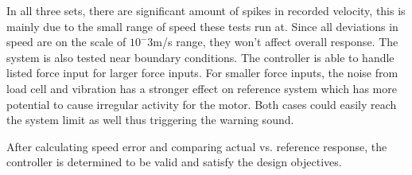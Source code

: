 In all three sets, there are significant amount of spikes in recorded velocity, this is mainly due to the small range of speed these tests run at. Since all deviations in speed are on the scale of $10^-3$m/s range, they won't affect overall response. The system is also tested near boundary conditions. The controller is able to handle listed force input for larger force inputs. For smaller force inputs, the noise from load cell and vibration has a stronger effect on reference system which has more potential to cause irregular activity for the motor. Both cases could easily reach the system limit as well thus triggering the warning sound.

After calculating speed error and comparing actual vs. reference response, the controller is determined to be valid and satisfy the design objectives.
